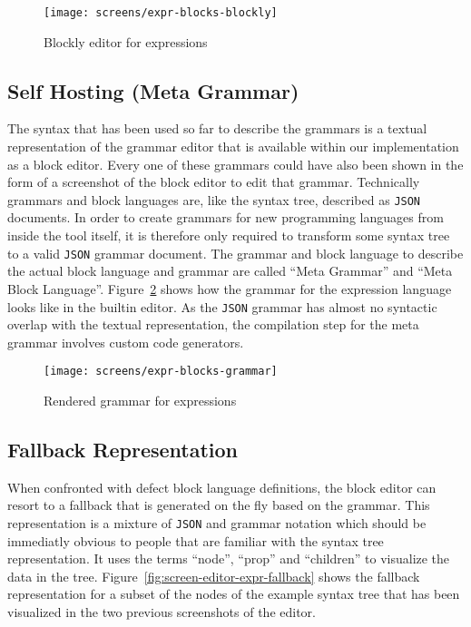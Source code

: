 \documentclass[sigconf,natbib=false]{acmart}
\newcommand{\enquote}[1]{``#1''}
\begin{document}
\begin{figure}[H]
  \texttt{[image: screens/expr-blocks-blockly]}
  \caption{Blockly editor for expressions}
  \label{fig:screen-editor-expr-blockly}
\end{figure}

\subsection{Self Hosting (Meta Grammar)}

The syntax that has been used so far to describe the grammars is a textual representation of the grammar editor that is available within our implementation as a block editor. Every one of these grammars could have also been shown in the form of a screenshot of the block editor to edit that grammar. Technically grammars and block languages are, like the syntax tree, described as \texttt{JSON} documents. In order to create grammars for new programming languages from inside the tool itself, it is therefore only required to transform some syntax tree to a valid \texttt{JSON} grammar document. The grammar and block language to describe the actual block language and grammar are called \enquote{Meta Grammar} and \enquote{Meta Block Language}. Figure~\ref{fig:screen-editor-expr-grammar} shows how the grammar for the expression language looks like in the builtin editor. As the \texttt{JSON} grammar has almost no syntactic overlap with the textual representation, the compilation step for the meta grammar involves custom code generators.

\begin{figure}
  \texttt{[image: screens/expr-blocks-grammar]}
  \caption{Rendered grammar for expressions}
  \label{fig:screen-editor-expr-grammar}
\end{figure}

\subsection{Fallback Representation}

When confronted with defect block language definitions, the block editor can resort to a fallback that is generated on the fly based on the grammar. This representation is a mixture of \texttt{JSON} and grammar notation which should be immediatly obvious to people that are familiar with the syntax tree representation. It uses the terms \enquote{node}, \enquote{prop} and \enquote{children} to visualize the data in the tree. Figure~\ref{fig:screen-editor-expr-fallback} shows the fallback representation for a subset of the nodes of the example syntax tree that has been visualized in the two previous screenshots of the editor.
\end{document}
